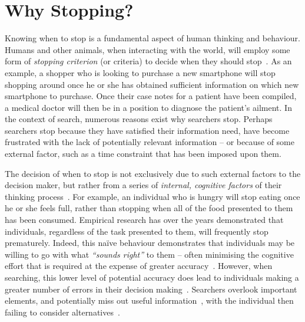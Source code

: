 \section{Why Stopping?}\label{sec:stopping_background:why}
Knowing when to stop is a fundamental aspect of human thinking and behaviour. Humans and other animals, when interacting with the world, will employ some form of \emph{stopping criterion} (or criteria) to decide when they should stop~\citep{nickles1995judgment}. As an example, a shopper who is looking to purchase a new smartphone will stop shopping around once he or she has obtained sufficient information on which new smartphone to purchase. Once their case notes for a patient have been compiled, a medical doctor will then be in a position to diagnose the patient's ailment. In the context of search, numerous reasons exist why searchers stop. Perhaps searchers stop because they have satisfied their information need, have become frustrated with the lack of potentially relevant information -- or because of some external factor, such as a time constraint that has been imposed upon them.

The decision of when to stop is not exclusively due to such external factors to the decision maker, but rather from a series of \emph{internal, cognitive factors} of their thinking process~\citep{nickles1995judgment}. For example, an individual who is hungry will stop eating once he or she feels full, rather than stopping when all of the food presented to them has been consumed. Empirical research has over the years demonstrated that individuals, regardless of the task presented to them, will frequently stop prematurely. Indeed, this na\"{i}ve behaviour demonstrates that individuals may be willing to go with what \emph{``sounds right''} to them -- often minimising the cognitive effort that is required at the expense of greater accuracy~\citep{perkins1983difficulties}. However, when searching, this lower level of potential accuracy does lead to individuals making a greater number of errors in their decision making~\citep{baron1988heuristics}. Searchers overlook important elements, and potentially miss out useful information~\citep{fischhoff1977cost_benefit, fischhoff1978fault, shafir1992thinking}, with the individual then failing to consider alternatives~\citep{farquhar1993decision_structuring}.

